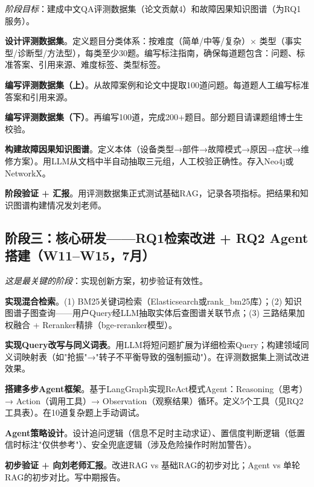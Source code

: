 \documentclass[a4paper, 11pt]{ctexart}
\begin{document}
\noindent\textit{阶段目标}：建成中文QA评测数据集（论文贡献4）和故障因果知识图谱（为RQ1服务）。

\begin{description}[style=nextline, leftmargin=1.2cm, labelwidth=1cm, font=\bfseries\color{tsinghua}]
\item[W6] \textbf{设计评测数据集}。定义题目分类体系：按难度（简单/中等/复杂）× 类型（事实型/诊断型/方法型），每类至少30题。编写标注指南，确保每道题包含：问题、标准答案、引用来源、难度标签、类型标签。
\item[W7] \textbf{编写评测数据集（上）}。从故障案例和论文中提取100道问题。每道题人工编写标准答案和引用来源。
\item[W8] \textbf{编写评测数据集（下）}。再编写100道，完成200+题目。部分题目请课题组博士生校验。
\item[W9] \textbf{构建故障因果知识图谱}。定义本体（设备类型→部件→故障模式→原因→症状→维修方案）。用LLM从文档中半自动抽取三元组，人工校验正确性。存入Neo4j或NetworkX。
\item[W10] \textbf{阶段验证 + 汇报}。用评测数据集正式测试基础RAG，记录各项指标。把结果和知识图谱构建情况发刘老师。
\end{description}

\subsection{阶段三：核心研发——RQ1检索改进 + RQ2 Agent搭建（W11--W15，7月）}

\noindent\textit{这是最关键的阶段}：实现创新方案，初步验证有效性。

\begin{description}[style=nextline, leftmargin=1.2cm, labelwidth=1cm, font=\bfseries\color{tsinghua}]
\item[W11] \textbf{实现混合检索}。(1) BM25关键词检索（Elasticsearch或rank\_bm25库）；(2) 知识图谱子图查询——用户Query经LLM抽取实体后查图谱关联节点；(3) 三路结果加权融合 + Reranker精排（bge-reranker模型）。
\item[W12] \textbf{实现Query改写与同义词表}。用LLM将短问题扩展为详细检索Query；构建领域同义词映射表（如"抢振"→"转子不平衡导致的强制振动"）。在评测数据集上测试改进效果。
\item[W13] \textbf{搭建多步Agent框架}。基于LangGraph实现ReAct模式Agent：Reasoning（思考）→ Action（调用工具）→ Observation（观察结果）循环。定义5个工具（见RQ2工具表）。在10道复杂题上手动调试。
\item[W14] \textbf{Agent策略设计}。设计追问逻辑（信息不足时主动求证）、置信度判断逻辑（低置信时标注"仅供参考"）、安全兜底逻辑（涉及危险操作时附加警告）。
\item[W15] \textbf{初步验证 + 向刘老师汇报}。改进RAG vs 基础RAG的初步对比；Agent vs 单轮RAG的初步对比。写中期报告。
\end{description}
\end{document}
